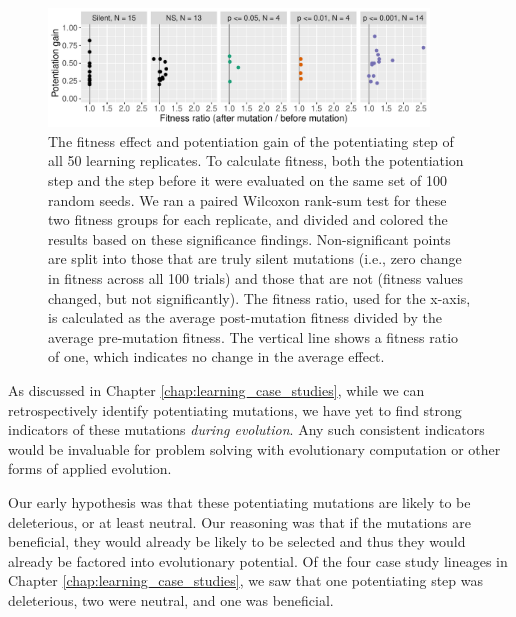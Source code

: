 \begin{figure}[h!]
\begin{center}
\includegraphics[width=0.9\textwidth]{04_learning_extension/media/fitness_diffs.pdf}
\end{center}
\caption{ 
The fitness effect and potentiation gain of the potentiating step of all 50 learning replicates. 
To calculate fitness, both the potentiation step and the step before it were evaluated on the same set of 100 random seeds. 
We ran a paired Wilcoxon rank-sum test for these two fitness groups for each replicate, and divided and colored the results based on these significance findings. 
Non-significant points are split into those that are truly silent mutations (i.e., zero change in fitness across all 100 trials) and those that are not (fitness values changed, but not significantly). 
The fitness ratio, used for the x-axis, is calculated as the average post-mutation fitness divided by the average pre-mutation fitness. 
The vertical line shows a fitness ratio of one, which indicates no change in the average effect. 
}\label{fig:fitness_diffs}
\end{figure}

As discussed in Chapter \ref{chap:learning_case_studies}, while we can retrospectively identify potentiating mutations, we have yet to find strong indicators of these mutations \textit{during evolution}.
Any such consistent indicators would be invaluable for problem solving with evolutionary computation or other forms of applied evolution. 

Our early hypothesis was that these potentiating mutations are likely to be deleterious, or at least neutral. 
Our reasoning was that if the mutations are beneficial, they would already be likely to be selected and thus they would already be factored into  %
evolutionary potential. 
Of the four case study lineages in Chapter \ref{chap:learning_case_studies}, we saw that one potentiating step was deleterious, two were neutral, and one was beneficial. 

